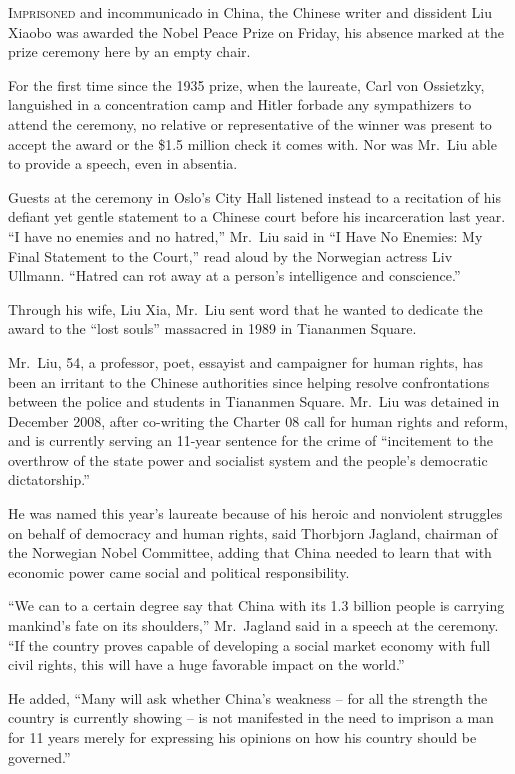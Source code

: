 ﻿\documentclass[12pt]{article}
\begin{document}
\lettrine{I}{mprisoned} and incommunicado in China, the Chinese writer and
dissident Liu Xiaobo was awarded the Nobel Peace Prize on Friday, his absence marked at the prize
ceremony here by an empty chair.

For the first time since the 1935 prize, when the laureate, Carl von Ossietzky, languished in a
concentration camp and Hitler forbade any sympathizers to attend the ceremony, no relative or
representative of the winner was present to accept the award or the \$1.5 million check it comes
with. Nor was Mr.~Liu able to provide a speech, even in absentia.

Guests at the ceremony in Oslo's City Hall listened instead to a recitation of his defiant yet
gentle statement to a Chinese court before his incarceration last year. ``I have no enemies and no
hatred,'' Mr.~Liu said in ``I Have No Enemies: My Final Statement to the Court,'' read aloud by the
Norwegian actress Liv Ullmann. ``Hatred can rot away at a person's intelligence and conscience.''

Through his wife, Liu Xia, Mr.~Liu sent word that he wanted to dedicate the award to the ``lost
souls'' massacred in 1989 in Tiananmen Square.

Mr.~Liu, 54, a professor, poet, essayist and campaigner for human rights, has been an irritant to
the Chinese authorities since helping resolve confrontations between the police and students in
Tiananmen Square. Mr.~Liu was detained in December 2008, after co-writing the Charter 08 call for
human rights and reform, and is currently serving an 11-year sentence for the crime of ``incitement
to the overthrow of the state power and socialist system and the people's democratic dictatorship.''

He was named this year's laureate because of his heroic and nonviolent struggles on behalf of
democracy and human rights, said Thorbjorn Jagland, chairman of the Norwegian Nobel Committee,
adding that China needed to learn that with economic power came social and political responsibility.

``We can to a certain degree say that China with its 1.3 billion people is carrying mankind's fate
on its shoulders,'' Mr.~Jagland said in a speech at the ceremony. ``If the country proves capable of
developing a social market economy with full civil rights, this will have a huge favorable impact on
the world.''

He added, ``Many will ask whether China's weakness -- for all the strength the country is currently
showing -- is not manifested in the need to imprison a man for 11 years merely for expressing his
opinions on how his country should be governed.''
\end{document}
